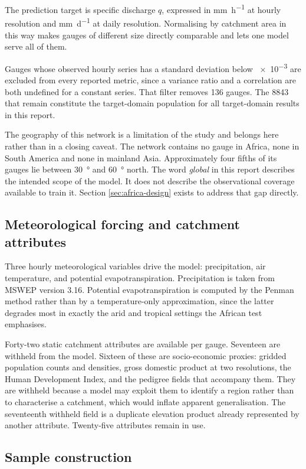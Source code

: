 The prediction target is specific discharge $q$, expressed in \si{\mm\per\hour} at hourly
resolution and \si{\mm\per\day} at daily resolution. Normalising by catchment area in this
way makes gauges of different size directly comparable and lets one model serve all of them.

Gauges whose observed hourly series has a standard deviation below \num{e-3} are excluded
from every reported metric, since a variance ratio and a correlation are both undefined for a
constant series. That filter removes \num{136} gauges. The \num{8843} that remain constitute
the target-domain population for all target-domain results in this report.

The geography of this network is a limitation of the study and belongs here rather than in a
closing caveat. The network contains no gauge in Africa, none in South America and none in
mainland Asia. Approximately four fifths of its gauges lie between \SI{30}{\degree} and
\SI{60}{\degree} north. The word \emph{global} in this report describes the intended scope of
the model. It does not describe the observational coverage available to train it. Section
\ref{sec:africa-design} exists to address that gap directly.

\subsection{Meteorological forcing and catchment attributes}

Three hourly meteorological variables drive the model: precipitation, air temperature, and
potential evapotranspiration. Precipitation is taken from MSWEP version 3.16. Potential
evapotranspiration is computed by the Penman method rather than by a temperature-only
approximation, since the latter degrades most in exactly the arid and tropical settings the
African test emphasises.

Forty-two static catchment attributes are available per gauge. Seventeen are withheld from
the model. Sixteen of these are socio-economic proxies: gridded population counts and
densities, gross domestic product at two resolutions, the Human Development Index, and the
pedigree fields that accompany them. They are withheld because a model may exploit them to
identify a region rather than to characterise a catchment, which would inflate apparent
generalisation. The seventeenth withheld field is a duplicate elevation product already
represented by another attribute. Twenty-five attributes remain in use.

\subsection{Sample construction}

